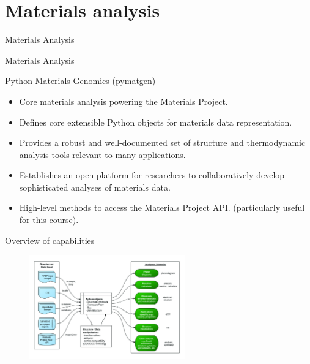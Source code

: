 \documentclass[aspectratio=169]{beamer}
\begin{document}
    \section{Materials analysis}

    \begin{frame}{Materials Analysis}
        \Huge{\centerline{Materials Analysis}}
    \end{frame}

    \begin{frame}{Python Materials Genomics (pymatgen)}
        \begin{itemize}
            \item Core materials analysis powering the Materials Project.\cite{ongPythonMaterialsGenomics2013}
            \item Defines core extensible Python objects for materials data representation.
            \item Provides a robust and well-documented set of structure and thermodynamic analysis tools relevant to many applications.
            \item Establishes an open platform for researchers to collaboratively develop sophisticated analyses of materials data.
            \item High-level methods to access the Materials Project API.\cite{ongMaterialsApplicationProgramming2015} (particularly useful for this course).
        \end{itemize}
    \end{frame}


    \begin{frame}{Overview of capabilities}
        \begin{figure}
            \centering
            \includegraphics[width=0.6\textwidth]{figures/pymatgen-overview.jpg}
        \end{figure}
    \end{frame}
\end{document}
